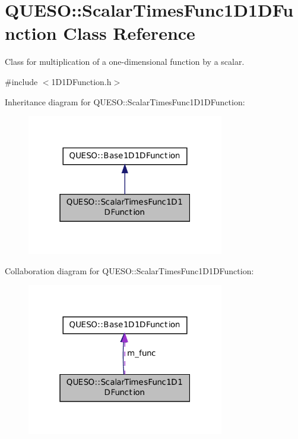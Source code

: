 \hypertarget{class_q_u_e_s_o_1_1_scalar_times_func1_d1_d_function}{\section{Q\-U\-E\-S\-O\-:\-:Scalar\-Times\-Func1\-D1\-D\-Function Class Reference}
\label{class_q_u_e_s_o_1_1_scalar_times_func1_d1_d_function}
}


Class for multiplication of a one-\/dimensional function by a scalar.  




{\ttfamily \#include $<$1\-D1\-D\-Function.\-h$>$}



Inheritance diagram for Q\-U\-E\-S\-O\-:\-:Scalar\-Times\-Func1\-D1\-D\-Function\-:
\nopagebreak
\begin{figure}[H]
\begin{center}
\leavevmode
\includegraphics[width=244pt]{class_q_u_e_s_o_1_1_scalar_times_func1_d1_d_function__inherit__graph}
\end{center}
\end{figure}


Collaboration diagram for Q\-U\-E\-S\-O\-:\-:Scalar\-Times\-Func1\-D1\-D\-Function\-:
\nopagebreak
\begin{figure}[H]
\begin{center}
\leavevmode
\includegraphics[width=244pt]{class_q_u_e_s_o_1_1_scalar_times_func1_d1_d_function__coll__graph}
\end{center}
\end{figure}
